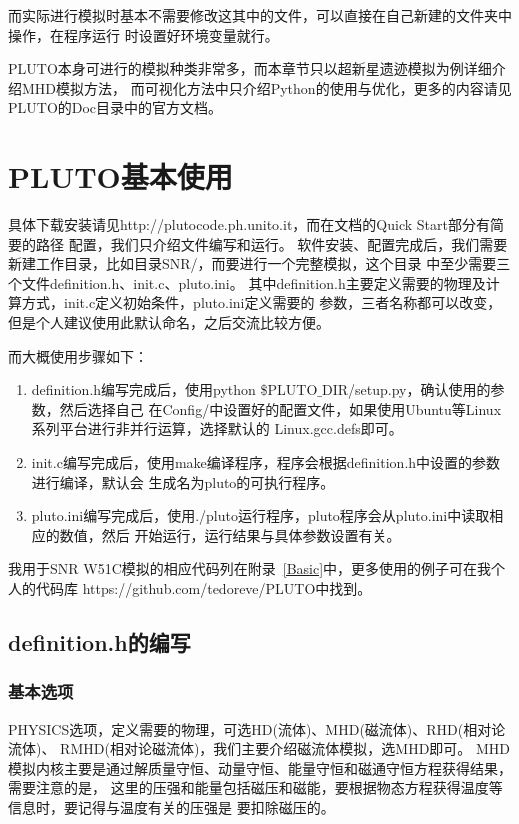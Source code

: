 而实际进行模拟时基本不需要修改这其中的文件，可以直接在自己新建的文件夹中操作，在程序运行
时设置好环境变量就行。

PLUTO本身可进行的模拟种类非常多，而本章节只以超新星遗迹模拟为例详细介绍MHD模拟方法，
而可视化方法中只介绍Python的使用与优化，更多的内容请见PLUTO的Doc目录中的官方文档。

\section{PLUTO基本使用}
\label{PLUTOuse}
具体下载安装请见http://plutocode.ph.unito.it，而在文档的Quick Start部分有简要的路径
配置，我们只介绍文件编写和运行。
软件安装、配置完成后，我们需要新建工作目录，比如目录SNR/，而要进行一个完整模拟，这个目录
中至少需要三个文件definition.h、init.c、pluto.ini。
其中definition.h主要定义需要的物理及计算方式，init.c定义初始条件，pluto.ini定义需要的
参数，三者名称都可以改变，但是个人建议使用此默认命名，之后交流比较方便。

而大概使用步骤如下：
\begin{enumerate}

    \item definition.h编写完成后，使用python \$PLUTO$\_$DIR/setup.py，确认使用的参数，然后选择自己
    在Config/中设置好的配置文件，如果使用Ubuntu等Linux系列平台进行非并行运算，选择默认的
    Linux.gcc.defs即可。

    \item init.c编写完成后，使用make编译程序，程序会根据definition.h中设置的参数进行编译，默认会
    生成名为pluto的可执行程序。

    \item pluto.ini编写完成后，使用./pluto运行程序，pluto程序会从pluto.ini中读取相应的数值，然后
    开始运行，运行结果与具体参数设置有关。

\end{enumerate}
我用于SNR W51C模拟的相应代码列在附录~\ref{Basic}中，更多使用的例子可在我个人的代码库
https://github.com/tedoreve/PLUTO中找到。

\subsection{definition.h的编写}
\subsubsection{基本选项}

PHYSICS选项，定义需要的物理，可选HD(流体)、MHD(磁流体)、RHD(相对论流体)、
RMHD(相对论磁流体)，我们主要介绍磁流体模拟，选MHD即可。
MHD模拟内核主要是通过解质量守恒、动量守恒、能量守恒和磁通守恒方程获得结果，需要注意的是，
这里的压强和能量包括磁压和磁能，要根据物态方程获得温度等信息时，要记得与温度有关的压强是
要扣除磁压的。

